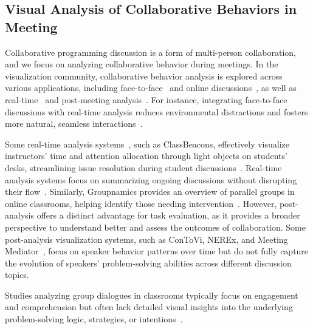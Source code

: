 \subsection{Visual Analysis of Collaborative Behaviors in Meeting}
Collaborative programming discussion is a form of multi-person collaboration, and we focus on analyzing collaborative behavior during meetings.
In the visualization community, collaborative behavior analysis is explored across various applications, including face-to-face~\cite{bachour2010interactive} and online discussions~\cite{wang2024meeting}, as well as real-time~\cite{son2023okay} and post-meeting analysis~\cite{shi2018meetingvis}. 
 For instance, integrating face-to-face discussions with real-time analysis reduces environmental distractions and fosters more natural, seamless interactions~\cite{aseniero2020meetcues}. 


Some real-time analysis systems~\cite{chen2023meetscript,chandrasegaran2019talktraces,shi2017ideawall}, such as ClassBeacons, effectively visualize instructors' time and attention allocation through light objects on students' desks, streamlining issue resolution during student discussions~\cite{an2019classbeacons,an2018classbeacons}. 
Real-time analysis systems focus on summarizing ongoing discussions without disrupting their flow~\cite{haliburton2023walking}. Similarly, Groupnamics provides an overview of parallel groups in online classrooms, helping identify those needing intervention~\cite{sato2023groupnamics}.
However, post-analysis offers a distinct advantage for task evaluation, as it provides a broader perspective to understand better and assess the outcomes of collaboration.
Some post-analysis visualization systems, such as ConToVi, NEREx, and Meeting Mediator~\cite{el2016contovi,el2017nerex,kim2008meeting}, focus on speaker behavior patterns over time but do not fully capture the evolution of speakers' problem-solving abilities across different discussion topics. 

Studies analyzing group dialogues in classrooms typically focus on engagement and comprehension but often lack detailed visual insights into the underlying problem-solving logic, strategies, or intentions~\cite{fujii2018sync,macneil2019ineqdetect,tausch2014groupgarden}.
